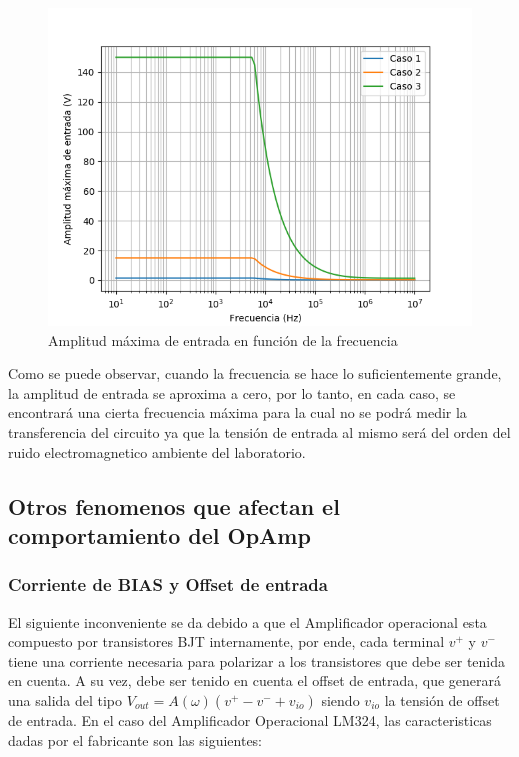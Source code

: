 \begin{figure}[H]
\begin{centering}
\includegraphics[scale=0.5]{../Ex1/iA/Resources1a/AmplMaxVsFreq123}
\par\end{centering}
\caption{Amplitud máxima de entrada en función de la frecuencia}

\end{figure}

Como se puede observar, cuando la frecuencia se hace lo suficientemente
grande, la amplitud de entrada se aproxima a cero, por lo tanto, en
cada caso, se encontrará una cierta frecuencia máxima para la cual
no se podrá medir la transferencia del circuito ya que la tensión
de entrada al mismo será del orden del ruido electromagnetico ambiente
del laboratorio.

\subsection{Otros fenomenos que afectan el comportamiento del OpAmp}

\subsubsection{Corriente de BIAS y Offset de entrada}

El siguiente inconveniente se da debido a que el Amplificador operacional
esta compuesto por transistores BJT internamente, por ende, cada terminal
$v^{+}$ y $v^{-}$ tiene una corriente necesaria para polarizar a
los transistores que debe ser tenida en cuenta. A su vez, debe ser
tenido en cuenta el offset de entrada, que generará una salida del
tipo $V_{out}=A(\omega)\left(v^{+}-v^{-}+v_{io}\right)$ siendo $v_{io}$
la tensión de offset de entrada. En el caso del Amplificador Operacional
LM324, las caracteristicas dadas por el fabricante son las siguientes:

